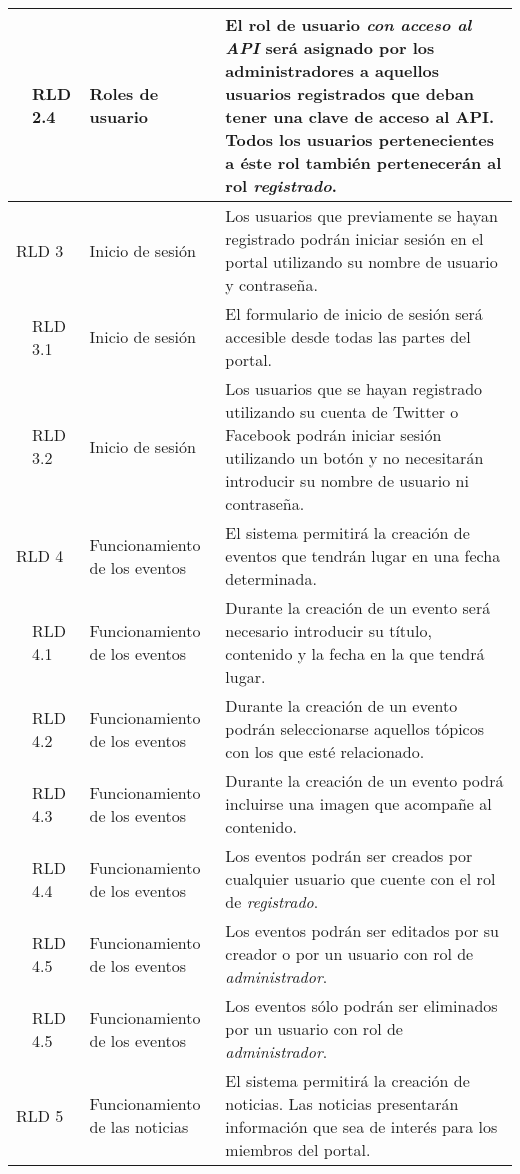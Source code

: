 \begin{longtable}[c]{|p{1mm}|p{14mm}|p{30mm}|p{90mm}|}
\hline
& RLD 2.4 & Roles de usuario & El rol de usuario \textit{con acceso al API} será asignado por los administradores a aquellos usuarios registrados que deban tener una clave de acceso al API.  Todos los usuarios pertenecientes a éste rol también pertenecerán al rol \textit{registrado}. \\
\hline
\multicolumn{2}{|l|}{RLD 3} & Inicio de sesión & Los usuarios que previamente se hayan registrado podrán iniciar sesión en el portal utilizando su nombre de usuario y contraseña. \\
\hline
& RLD 3.1 & Inicio de sesión & El formulario de inicio de sesión será accesible desde todas las partes del portal. \\
\hline
& RLD 3.2 & Inicio de sesión & Los usuarios que se hayan registrado utilizando su cuenta de Twitter o Facebook podrán iniciar sesión utilizando un botón y no necesitarán introducir su nombre de usuario ni contraseña. \\
\hline
\multicolumn{2}{|l|}{RLD 4} & Funcionamiento de los eventos & El sistema permitirá la creación de eventos que tendrán lugar en una fecha determinada. \\
\hline
& RLD 4.1 & Funcionamiento de los eventos & Durante la creación de un evento será necesario introducir su título, contenido y la fecha en la que tendrá lugar. \\
\hline
& RLD 4.2 & Funcionamiento de los eventos & Durante la creación de un evento podrán seleccionarse aquellos tópicos con los que esté relacionado. \\
\hline
& RLD 4.3 & Funcionamiento de los eventos & Durante la creación de un evento podrá incluirse una imagen que acompañe al contenido. \\
\hline
& RLD 4.4 & Funcionamiento de los eventos & Los eventos podrán ser creados por cualquier usuario que cuente con el rol de \textit{registrado}. \\
\hline
& RLD 4.5 & Funcionamiento de los eventos & Los eventos podrán ser editados por su creador o por un usuario con rol de \textit{administrador}. \\
\hline
& RLD 4.5 & Funcionamiento de los eventos & Los eventos sólo podrán ser eliminados por un usuario con rol de \textit{administrador}. \\
\hline
\multicolumn{2}{|l|}{RLD 5} & Funcionamiento de las noticias & El sistema permitirá la creación de noticias.  Las noticias presentarán información que sea de interés para los miembros del portal. \\
\hline

\end{longtable}
